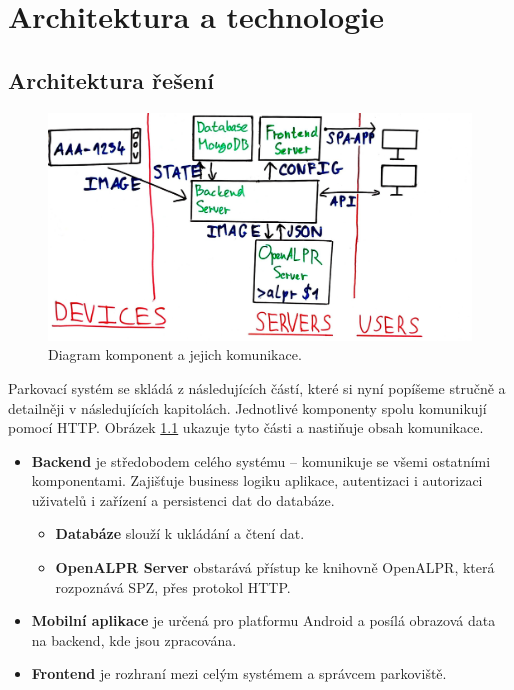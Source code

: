 
\chapter{Architektura a technologie} \label{archtech}

\section{Architektura řešení} \label{architektura_reseni}

\begin{figure} \centering
  \includegraphics[width=145mm]{../img/architecture_drawing.jpg}
  \caption{Diagram komponent a jejich komunikace.}
  \label{fig:architecture_drawing}
\end{figure}

\noindent
Parkovací systém se skládá z následujících částí, které si nyní popíšeme stručně a detailněji v
následujících kapitolách.
Jednotlivé komponenty spolu komunikují pomocí HTTP.
Obrázek \ref{fig:architecture_drawing} ukazuje tyto části a nastiňuje obsah komunikace.

\begin{itemize}
  \setlength\itemsep{.05em}
  \item \textbf{Backend} je středobodem celého systému -- komunikuje se všemi ostatními komponentami.
  Zajišťuje business logiku aplikace, autentizaci i autorizaci uživatelů i zařízení
  a persistenci dat do databáze.
  \begin{itemize}
    \setlength\itemsep{.05em}
    \item \textbf{Databáze} slouží k ukládání a čtení dat.
    \item \textbf{OpenALPR Server} obstarává přístup
          ke knihovně OpenALPR, která rozpoznává SPZ, přes protokol HTTP.
  \end{itemize}
  \item \textbf{Mobilní aplikace} je určená pro platformu Android a posílá obrazová data na backend,
        kde jsou zpracována.
  \item \textbf{Frontend} je rozhraní mezi celým systémem a správcem parkoviště.
\end{itemize}

